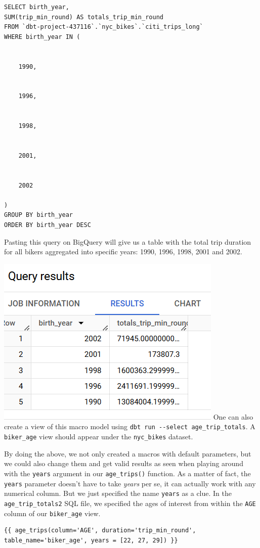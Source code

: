 \documentclass[
]{book}
\begin{document}
\begin{verbatim}
SELECT birth_year, 
SUM(trip_min_round) AS totals_trip_min_round
FROM `dbt-project-437116`.`nyc_bikes`.`citi_trips_long`
WHERE birth_year IN (
  
  
    1990, 
  
  
    1996, 
  
  
    1998, 
  
  
    2001, 
  
  
    2002
  
)
GROUP BY birth_year
ORDER BY birth_year DESC
\end{verbatim}

Pasting this query on BigQuery will give us a table with the total trip duration for all bikers aggregated into specific years: 1990, 1996, 1998, 2001 and 2002.

\includegraphics{./images/age_trip.png}
One can also create a view of this macro model using \texttt{dbt\ run\ -\/-select\ age\_trip\_totals}. A \texttt{biker\_age} view should appear under the \texttt{nyc\_bikes} dataset.

By doing the above, we not only created a macros with default parameters, but we could also change them and get valid results as seen when playing around with the \texttt{years} argument in our \texttt{age\_trips()} function. As a matter of fact, the \texttt{years} parameter doesn't have to take \emph{years} per se, it can actually work with any numerical column. But we just specified the name \texttt{years} as a clue. In the \texttt{age\_trip\_totals2} SQL file, we specified the ages of interest from within the \texttt{AGE} column of our \texttt{biker\_age} view.

\begin{verbatim}
{{ age_trips(column='AGE', duration='trip_min_round',
table_name='biker_age', years = [22, 27, 29]) }}
\end{verbatim}
\end{document}
